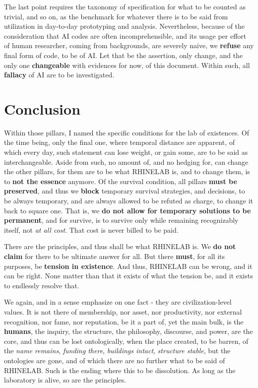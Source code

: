 \documentclass[10pt,a4paper]{article}
\begin{document}
The last point requires the taxonomy of specification for what to be counted as trivial, and so on, as the benchmark for whatever there is to be said from utilization in day-to-day prototyping and analysis. Nevertheless, because of the consideration that AI codes are often incomprehensible, and its usage per effort of human researcher, coming from backgrounds, are severely naive, we \textbf{refuse} any final form of code, to be of AI. Let that be the assertion, only change, and the only one \textbf{changeable} with evidences for now, of this document. Within such, all \textbf{fallacy} of AI are to be investigated. 

\section{Conclusion}

Within those pillars, I named the specific conditions for the lab of existences. Of the time being, only the final one, where temporal distance are apparent, of which every day, such statement can lose weight, or gain some, are to be said as interchangeable. Aside from such, no amount of, and no hedging for, can change the other pillars, for them are to be what RHINELAB is, and to change them, is to \textbf{not the essence} anymore. Of the survival condition, all pillars \textbf{must be preserved}, and thus we \textbf{block} temporary survival strategies, and decisions, to be always temporary, and are always allowed to be refuted as charge, to change it back to square one. That is, we \textbf{do not allow for temporary solutions to be permanent}, and for survive, is to survive only while remaining recognizably itself, not \textit{at all cost}. That cost is never billed to be paid. 

There are the principles, and thus shall be what RHINELAB is. We \textbf{do not claim} for there to be ultimate answer for all. But there \textbf{must}, for all its purposes, be \textbf{tension in existence}. And thus, RHINELAB can be wrong, and it can be right. None matter than that it exists of what the tension be, and it exists to endlessly resolve that. 

We again, and in a sense emphasize on one fact - they are civilization-level values. It is not there of membership, nor asset, nor productivity, nor external recognition, nor fame, nor reputation, be it a part of, yet the main bulk, is the \textbf{humans}, the inquiry, the structure, the philosophy, discourse, and power, are the core, and thus can be lost ontologically, when the place created, to be barren, of the \textit{name remains}, \textit{funding there}, \textit{buildings intact}, \textit{structure stable}, but the ontologies are gone, and of which there are no further what to be said of RHINELAB. Such is the ending where this to be dissolution. As long as the laboratory is alive, so are the principles. 
\end{document}
